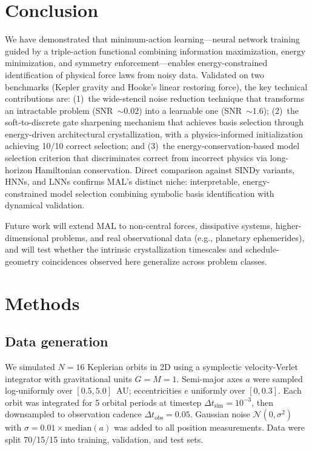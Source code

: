 \documentclass[aps,pre,reprint,superscriptaddress,longbibliography]{revtex4-2}
\begin{document}
\section{Conclusion}
We have demonstrated that minimum-action learning---neural network training guided by a triple-action functional combining information maximization, energy minimization, and symmetry enforcement---enables energy-constrained identification of physical force laws from noisy data. Validated on two benchmarks (Kepler gravity and Hooke's linear restoring force), the key technical contributions are: (1)~the wide-stencil noise reduction technique that transforms an intractable problem (SNR~$\sim 0.02$) into a learnable one (SNR~$\sim 1.6$); (2)~the soft-to-discrete gate sharpening mechanism that achieves basis selection through energy-driven architectural crystallization, with a physics-informed initialization achieving 10/10 correct selection; and (3)~the energy-conservation-based model selection criterion that discriminates correct from incorrect physics via long-horizon Hamiltonian conservation. Direct comparison against SINDy variants, HNNs, and LNNs confirms MAL's distinct niche: interpretable, energy-constrained model selection combining symbolic basis identification with dynamical validation.

Future work will extend MAL to non-central forces, dissipative systems, higher-dimensional problems, and real observational data (e.g., planetary ephemerides), and will test whether the intrinsic crystallization timescales and schedule-geometry coincidences observed here generalize across problem classes.

\section{Methods}
\label{sec:methods}

\subsection{Data generation}
We simulated $N=16$ Keplerian orbits in 2D using a symplectic velocity-Verlet integrator with gravitational units $G = M = 1$. Semi-major axes $a$ were sampled log-uniformly over $[0.5, 5.0]$~AU; eccentricities $e$ uniformly over $[0, 0.3]$. Each orbit was integrated for 5 orbital periods at timestep $\Delta t_{\text{sim}} = 10^{-3}$, then downsampled to observation cadence $\Delta t_{\text{obs}} = 0.05$. Gaussian noise $\mathcal{N}(0, \sigma^2)$ with $\sigma = 0.01 \times \text{median}(a)$ was added to all position measurements. Data were split 70/15/15 into training, validation, and test sets.
\end{document}
